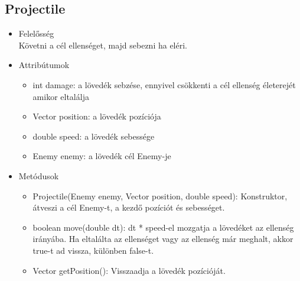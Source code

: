 \subsection{Projectile}
\begin{itemize}
\item Felelősség\\
Követni a cél ellenséget, majd sebezni ha eléri.
\item Attribútumok
	\begin{itemize}
		\item int damage: a lövedék sebzése, ennyivel csökkenti a cél ellenség életerejét amikor eltalálja
		\item Vector position: a lövedék pozíciója
		\item double speed: a lövedék sebessége
		\item Enemy enemy: a lövedék cél Enemy-je
	\end{itemize}
\item Metódusok
	\begin{itemize}
		\item Projectile(Enemy enemy, Vector position, double speed): Konstruktor, átveszi a cél Enemy-t, a kezdő pozíciót és sebességet.
		\item boolean move(double dt): dt * speed-el mozgatja a lövedéket az ellenség irányába. Ha eltalálta az ellenséget vagy az ellenség már meghalt, akkor true-t ad vissza, különben false-t.
		\item Vector getPosition(): Visszaadja a lövedék pozícióját.
	\end{itemize}
\end{itemize}


